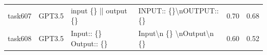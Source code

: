 \begin{longtable}{@{}p{0.8cm\tiny}p{1cm\tiny}p{4.1cm\ttfamily\tiny}p{4.1cm\ttfamily\tiny}p{0.8cm\tiny}p{0.8cm\tiny}@{}}
task607   & GPT3.5    & input \{\} || output \{\}                                                                                                                                                                                                                                                                                                                                                                                                                                                                                               & INPUT:: \{\}\textbackslash{}nOUTPUT:: \{\}                                                                                                                                                                                                                                                                                                                                                                                                                                                                                                                                        & 0.70 & 0.68 \\
task608   & GPT3.5    & Input:: \{\} Output:: \{\}                                                                                                                                                                                                                                                                                                                                                                                                                                                                                              & Input\textbackslash{}n    \{\} \textbackslash{}nOutput\textbackslash{}n    \{\}                                                                                                                                                                                                                                                                                                                                                                                                                                                                                                   & 0.60 & 0.52 \\

\end{longtable}
